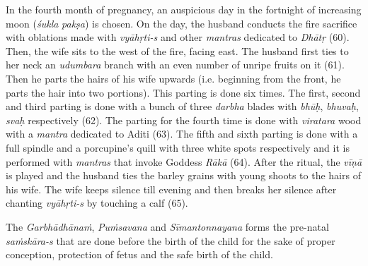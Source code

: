 \begin{enumerate}
  In the fourth month of pregnancy, an auspicious day in the fortnight of increasing moon (\emph{śukla} \emph{pakṣa}) is chosen. On the day, the husband conducts the fire sacrifice with oblations made with \emph{vyāhṛti-s} and other \emph{mantras} dedicated to \emph{Dhātṛ} (60). Then, the wife sits to the west of the fire, facing east. The husband first ties to her neck an \emph{udumbara} branch with an even number of unripe fruits on it (61). Then he parts the hairs of his wife upwards (i.e. beginning from the front, he parts the hair into two portions). This parting is done six times. The first, second and third parting is done with a bunch of three \emph{darbha} blades with \emph{bhūḥ}, \emph{bhuvaḥ}, \emph{svaḥ} respectively (62). The parting for the fourth time is done with \emph{viratara} wood with a \emph{mantra} dedicated to Aditi (63). The fifth and sixth parting is done with a full spindle and a porcupine's quill with three white spots respectively and it is performed with \emph{mantras} that invoke Goddess \emph{Rākā} (64). After the ritual, the \emph{vīṇā} is played and the husband ties the barley grains with young shoots to the hairs of his wife. The wife keeps silence till evening and then breaks her silence after chanting \emph{vyāhṛti-s} by touching a calf (65).
\end{enumerate}

The \emph{Garbhādhānaṁ}, \emph{Puṁsavana} and \emph{Sīmantonnayana} forms the pre-natal \emph{saṁskāra-s} that are done before the birth of the child for the sake of proper conception, protection of fetus and the safe birth of the child.

